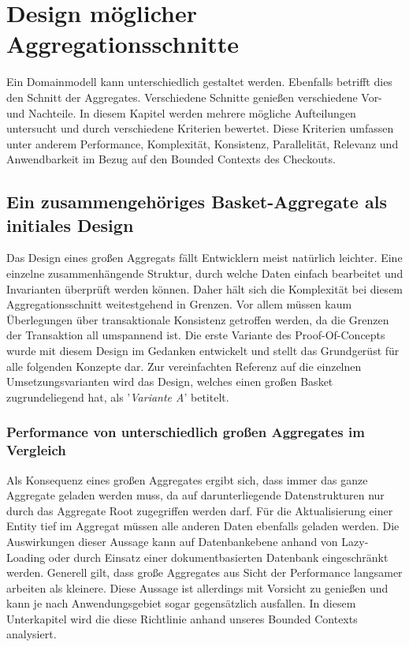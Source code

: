 \chapter{Design möglicher Aggregationsschnitte }

Ein Domainmodell kann unterschiedlich gestaltet werden. Ebenfalls betrifft dies den Schnitt der Aggregates. Verschiedene Schnitte genießen verschiedene Vor- und Nachteile. In diesem Kapitel werden mehrere mögliche Aufteilungen untersucht und durch verschiedene Kriterien bewertet. Diese Kriterien umfassen unter anderem Performance, Komplexität, Konsistenz, Parallelität, Relevanz und Anwendbarkeit im Bezug auf den Bounded Contexts des Checkouts.

\section{Ein zusammengehöriges Basket-Aggregate als initiales Design}

Das Design eines großen Aggregats fällt Entwicklern meist natürlich leichter. Eine einzelne zusammenhängende Struktur, durch welche Daten einfach bearbeitet und Invarianten überprüft werden können. Daher hält sich die Komplexität bei diesem Aggregationsschnitt weitestgehend in Grenzen. Vor allem müssen kaum Überlegungen über transaktionale Konsistenz getroffen werden, da die Grenzen der Transaktion all umspannend ist. Die erste Variante des Proof-Of-Concepts wurde mit diesem Design im Gedanken entwickelt und stellt das Grundgerüst für alle folgenden Konzepte dar. Zur vereinfachten Referenz auf die einzelnen Umsetzungsvarianten wird das Design, welches einen großen Basket zugrundeliegend hat, als '\emph{Variante A}' betitelt.


\subsection{Performance von unterschiedlich großen Aggregates im Vergleich}

Als Konsequenz eines großen Aggregates ergibt sich, dass immer das ganze Aggregate geladen werden muss, da auf darunterliegende Datenstrukturen nur durch das Aggregate Root zugegriffen werden darf. Für die Aktualisierung einer Entity tief im Aggregat müssen alle anderen Daten ebenfalls geladen werden. Die Auswirkungen dieser Aussage kann auf Datenbankebene anhand von Lazy-Loading oder durch Einsatz einer dokumentbasierten Datenbank eingeschränkt werden. Generell gilt, dass große Aggregates aus Sicht der Performance langsamer arbeiten als kleinere. Diese Aussage ist allerdings mit Vorsicht zu genießen und kann je nach Anwendungsgebiet sogar gegensätzlich ausfallen. In diesem Unterkapitel wird die diese Richtlinie anhand unseres Bounded Contexts analysiert.

